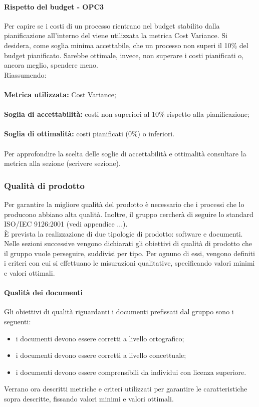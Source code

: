 \documentclass[PianoDiQualifica.tex]{subfiles}
\begin{document}
			\paragraph{Rispetto del budget - OPC3}
			Per capire se i costi di un processo rientrano nel budget stabilito dalla pianificazione all'interno del \PPdocRR{} viene utilizzata la metrica Cost Variance.
			Si desidera, come soglia minima accettabile, che un processo non superi il 10\% del budget pianificato. Sarebbe ottimale, invece, non superare i costi pianificati o, ancora meglio,
			spendere meno.\\
			Riassumendo: \\ \\
			\textbf{Metrica utilizzata:} Cost Variance; \\ \\
			\textbf{Soglia di accettabilità:} costi non superiori al 10\% rispetto alla pianificazione; \\ \\
			\textbf{Soglia di ottimalità:}  costi pianificati (0\%) o inferiori. \\ \\
			Per approfondire la scelta delle soglie di accettabilità e ottimalità consultare la metrica alla sezione (scrivere sezione).
			
		\subsubsection{Qualità di prodotto}
		Per garantire la migliore qualità del prodotto è necessario che i processi che lo producono abbiano alta qualità.
		Inoltre, il gruppo \GRUPPO{} cercherà di seguire lo standard ISO/IEC 9126:2001 (vedi appendice ...). \\
		È prevista la realizzazione di due tipologie di prodotto: software e documenti.
		Nelle sezioni successive vengono dichiarati gli obiettivi di qualità di prodotto che il gruppo vuole perseguire, suddivisi per tipo.
		Per ognuno di essi, vengono definiti i criteri con cui si effettuano le misurazioni qualitative, specificando valori minimi e valori ottimali.
		
			\paragraph{Qualità dei documenti}
			Gli obiettivi di qualità riguardanti i documenti prefissati dal gruppo \GRUPPO{} sono i seguenti:
			\begin{itemize}
				\item i documenti devono essere corretti a livello ortografico;
				\item i documenti devono essere corretti a livello concettuale;
				\item i documenti devono essere comprensibili da individui con licenza superiore.
			\end{itemize}
			Verrano ora descritti metriche e criteri utilizzati per garantire le caratteristiche sopra descritte, fissando valori minimi e valori ottimali.
			
\end{document}
